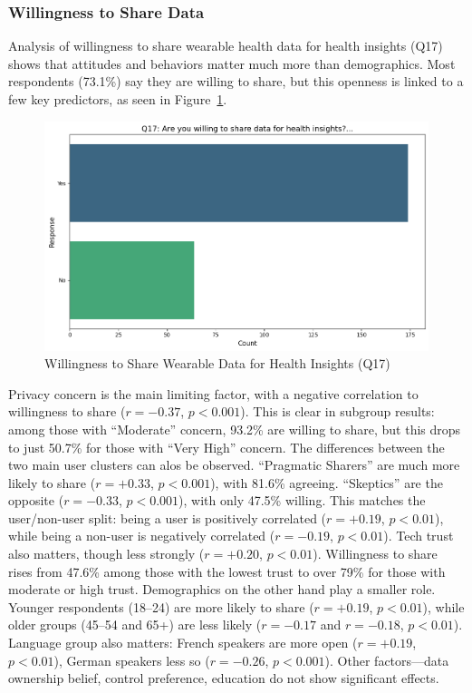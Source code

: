 	\subsubsection{Willingness to Share Data}
		Analysis of willingness to share wearable health data for health insights (Q17) shows that attitudes and behaviors matter much more than demographics. Most respondents (73.1\%) say they are willing to share, but this openness is linked to a few key predictors, as seen in Figure~\ref{fig:Q17_share}.
		\begin{figure}[ht]\centering
			\includegraphics[width=0.7\linewidth]{figures/questions/Q17_single_choice.png}
			\caption{Willingness to Share Wearable Data for Health Insights (Q17)}
			\label{fig:Q17_share}
		\end{figure}
		Privacy concern is the main limiting factor, with a negative correlation to willingness to share ($r = -0.37$, $p < 0.001$). This is clear in subgroup results: among those with ``Moderate'' concern, 93.2\% are willing to share, but this drops to just 50.7\% for those with ``Very High'' concern.
		The  differences between the two main user clusters can alos be observed. ``Pragmatic Sharers'' are much more likely to share ($r = +0.33$, $p < 0.001$), with 81.6\% agreeing. ``Skeptics'' are the opposite ($r = -0.33$, $p < 0.001$), with only 47.5\% willing. This matches the user/non-user split: being a user is positively correlated ($r = +0.19$, $p < 0.01$), while being a non-user is negatively correlated ($r = -0.19$, $p < 0.01$).
		Tech trust also matters, though less strongly ($r = +0.20$, $p < 0.01$). Willingness to share rises from 47.6\% among those with the lowest trust to over 79\% for those with moderate or high trust.
		Demographics on the other hand play a smaller role. Younger respondents (18--24) are more likely to share ($r = +0.19$, $p < 0.01$), while older groups (45--54 and 65+) are less likely ($r = -0.17$ and $r = -0.18$, $p < 0.01$). Language group also matters: French speakers are more open ($r = +0.19$, $p < 0.01$), German speakers less so ($r = -0.26$, $p < 0.001$). Other factors—data ownership belief, control preference, education do not show significant effects.

